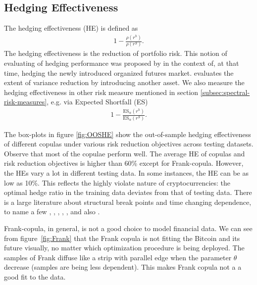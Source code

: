 \subsection{Hedging Effectiveness}\label{subsec:hedging-effectiveness}
The hedging effectiveness (HE) is defined as
\begin{align}
  1- \frac{\rho(r^h)}{\rho(r^S)}.
  \end{align}
The hedging effectiveness is the reduction of portfolio risk.
This notion of evaluating of hedging performance was proposed by \citet{ederington1979hedging} in the context of, at that time, hedging the newly introduced
organized futures market.
\citet{ederington1979hedging}  evaluates the extent of variance reduction by introducing another asset.
We also measure the hedging effectiveness in other risk measure mentioned in section \ref{subsec:spectral-risk-measures},
e.g. via Expected Shortfall (ES)
\begin{align}
  1- \frac{\text{ES}_\alpha(r^h)}{\text{ES}_\alpha(r^S)}.
  \end{align}

The box-plots in figure \ref{fig:OOSHE} show the out-of-sample hedging effectiveness of different copulas under various risk
reduction objectives across testing datasets.
Observe that most of the copulae perform well.
The average HE of copulas and risk reduction objectives is higher than 60\% except for Frank-copula.
However, the HEs vary a lot in different testing data.
In some instances, the HE can be as low as 10\%.
This reflects the highly violate nature of cryptocurrencies:
the optimal hedge ratio in the training data deviates from that of testing data.
There is a large literature about structural break points and time changing dependence, to name a few
\citet{hafner2012dynamic}, \citet{patton2006modelling}, \citet{creal2008general},
\citet{engle2002dynamic}, \citet{giacomini2009inhomogeneous}, and also
\citet{manner2012survey}.\medskip

Frank-copula, in general, is not a good choice to model financial data.
We can see from figure~\ref{fig:Frank} that the Frank copula is not fitting the Bitcoin and its future visually, no matter
which optimization procedure is being deployed.
The samples of Frank diffuse like a strip with parallel edge when the parameter $\theta$ decrease (samples are being less dependent).
This makes Frank copula not a a good fit to the data.

